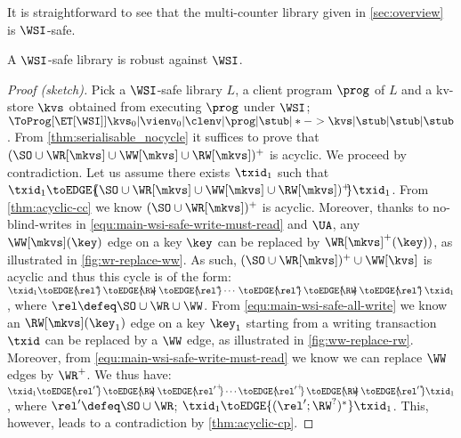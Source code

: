 It is straightforward to see that the  multi-counter
library given in \cref{sec:overview} is \(\WSI\)-safe. 






\begin{theorem}
 \label{thm:main-wsi-robust}
    A \(\WSI\)-safe library is robust against \(\WSI\).   
\end{theorem}
\SpaceBelowDef
%

%
\begin{proof}[Proof (sketch)]
Pick a \(\WSI\)-safe  library \( L \), a client program \( \prog \) of  $L$ and a kv-store \( \kvs \) obtained from executing \( \prog \) under $\WSI$;
\ie \( \ToProg[{\ET[\WSI]}]{\kvs_0 | \vienv_0 | \clenv | \prog | \stub | * -> \kvs | \stub | \stub | \stub }\).
From \cref{thm:serialisable_nocycle} it suffices to prove that $(\SO \cup \WR[\mkvs] \cup \WW[\mkvs] \cup \RW[\mkvs])^{+}$ is acyclic.
We proceed by contradiction.
Let us assume there exists $\txid_1$ such that $\txid_1 \toEDGE{\!\!(\SO \cup \WR[\mkvs] \cup \WW[\mkvs] \cup \RW[\mkvs])^{+}\!\!} \txid_1$. 
From \cref{thm:acyclic-cc} we know \( (\SO \cup \WR[\mkvs])^{+} \) is acyclic.
Moreover, thanks to no-blind-writes in \eqref{equ:main-wsi-safe-write-must-read} and \( \UA \),
any \( \WW[\mkvs](\key)\) edge on a key \( \key \) can be replaced by \( \WR[\mkvs]^{+}(\key) ) \), 
as illustrated in \cref{fig:wr-replace-ww}.
As such, \( (\SO \cup \WR[\mkvs])^{+} \cup \WW[\kvs]\) is acyclic and thus this cycle is of the form:
\(
    \txid_1 \toEDGE{\!\!\rel^*\!\!} \,\toEDGE{\!\!\RW\!\!}\, \toEDGE{\!\!\rel^*\!\!} \cdots \,\toEDGE{\!\!\rel^*\!\!}\, \toEDGE{\!\!\RW\!\!}\, \toEDGE{\!\!\rel^*\!\!}\, \txid_1
\),
where \( \rel \defeq \SO \cup \WR \cup \WW \).
From \eqref{equ:main-wsi-safe-all-write} we know 
an \( \RW[\mkvs](\key_1) \) edge on a key \( \key_1 \) starting from 
a writing transaction \( \txid \) can be replaced by a \( \WW \) edge,
as illustrated in \cref{fig:ww-replace-rw}.
Moreover, from \eqref{equ:main-wsi-safe-write-must-read} we know we can replace \( \WW \) edges by \( \WR^+ \).
We thus have:
\(
    \txid_1 \toEDGE{\!\!{\rel'}^*\!\!} \,\toEDGE{\!\!\RW\!\!}\, \toEDGE{\!\!{\rel'}^+\!\!} \cdots \toEDGE{\!\!{\rel'}^+\!\!} \,\toEDGE{\!\!\RW\!\!} \,\toEDGE{\!\!{\rel'}^*\!\!} \txid_1
\),
where \( \rel' \defeq \SO \cup \WR  \);
\ie \( \txid_1 \toEDGE{( \rel'; \RW^? )^* } \txid_1 \).
This, however, leads to a contradiction by \cref{thm:acyclic-cp}.
\renewcommand{\qed}{}
\end{proof}

